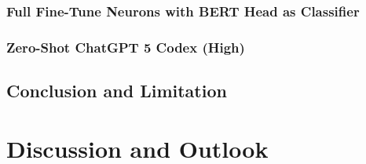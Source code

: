 \documentclass[12pt]{article}
\begin{document}
\subsubsection{Full Fine-Tune Neurons with BERT Head as Classifier}
\subsubsection{Zero-Shot ChatGPT 5 Codex (High)}


\subsection{Conclusion and Limitation}

\section{Discussion and Outlook}

\end{document}
